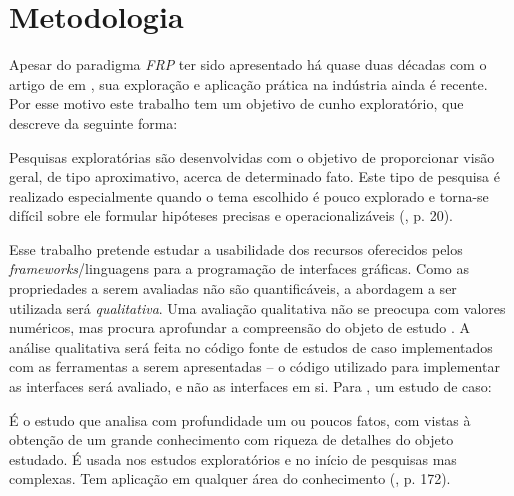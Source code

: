 \section{Metodologia}\label{lmetodologia}


Apesar do paradigma \emph{FRP} ter sido apresentado há
quase duas décadas com o artigo de 
em \citeyear{Elliott97franimation}, sua exploração e aplicação
prática na indústria ainda é recente.
Por esse motivo este trabalho tem um objetivo de
cunho exploratório, que 
descreve da seguinte forma:

\begin{citacao}
  Pesquisas exploratórias são desenvolvidas com o
  objetivo de proporcionar visão geral, de tipo aproximativo,
  acerca de determinado fato.
  Este tipo de pesquisa é realizado especialmente quando o
  tema escolhido é pouco explorado e torna-se difícil sobre
  ele formular hipóteses precisas e operacionalizáveis
  (\citeyear{gil2010metodos}, p. 20).
\end{citacao}

Esse trabalho pretende estudar a usabilidade dos recursos
oferecidos pelos \emph{frameworks}/linguagens para a
programação de interfaces gráficas.
Como as propriedades a serem avaliadas não são quantificáveis,
a abordagem a ser utilizada será \emph{qualitativa}.
Uma avaliação qualitativa não se
preocupa com valores numéricos, mas procura aprofundar
a compreensão do objeto de estudo \cite[p.~31]{gerhardt2009metodos}.
A análise qualitativa será feita no código fonte de estudos de caso
implementados com as ferramentas a serem apresentadas
-- o código utilizado para implementar as interfaces será
avaliado, e não as interfaces em si.
Para , um estudo de caso:

\begin{citacao}
  É o estudo que analisa com profundidade um ou poucos fatos,
  com vistas à obtenção de um grande conhecimento com riqueza
  de detalhes do objeto estudado. É usada nos estudos exploratórios
  e no início de pesquisas mas complexas. Tem aplicação em
  qualquer área do conhecimento (\citeyear{gil2010metodos}, p. 172).
\end{citacao}

